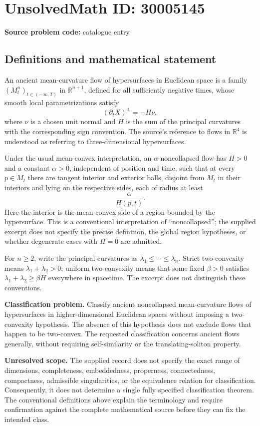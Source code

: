 \documentclass[11pt]{article}
\newcommand{\R}{\mathbb{R}}
\begin{document}
\section*{UnsolvedMath ID: 30005145}
\textbf{Source problem code:} catalogue entry
\subsection{Definitions and mathematical statement}
An ancient mean-curvature flow of hypersurfaces in Euclidean space is a family \((M_t^n)_{t\in(-\infty,T)}\) in \(\R^{n+1}\), defined for all sufficiently negative times, whose smooth local parametrizations satisfy
\[
(\partial_t X)^\perp=-H\nu,
\]
where \(\nu\) is a chosen unit normal and \(H\) is the sum of the principal curvatures with the corresponding sign convention. The source's reference to flows in \(\R^4\) is understood as referring to three-dimensional hypersurfaces.

Under the usual mean-convex interpretation, an \(\alpha\)-noncollapsed flow has \(H>0\) and a constant \(\alpha>0\), independent of position and time, such that at every \(p\in M_t\) there are tangent interior and exterior balls, disjoint from \(M_t\) in their interiors and lying on the respective sides, each of radius at least
\[
\frac{\alpha}{H(p,t)}.
\]
Here the interior is the mean-convex side of a region bounded by the hypersurface. This is a conventional interpretation of ``noncollapsed''; the supplied excerpt does not specify the precise definition, the global region hypotheses, or whether degenerate cases with \(H=0\) are admitted.

For \(n\geq2\), write the principal curvatures as \(\lambda_1\leq\cdots\leq\lambda_n\). Strict two-convexity means \(\lambda_1+\lambda_2>0\); uniform two-convexity means that some fixed \(\beta>0\) satisfies \(\lambda_1+\lambda_2\geq\beta H\) everywhere in spacetime. The excerpt does not distinguish these conventions.

\textbf{Classification problem.} Classify ancient noncollapsed mean-curvature flows of hypersurfaces in higher-dimensional Euclidean spaces without imposing a two-convexity hypothesis. The absence of this hypothesis does not exclude flows that happen to be two-convex. The requested classification concerns ancient flows generally, without requiring self-similarity or the translating-soliton property.

\textbf{Unresolved scope.} The supplied record does not specify the exact range of dimensions, completeness, embeddedness, properness, connectedness, compactness, admissible singularities, or the equivalence relation for classification. Consequently, it does not determine a single fully specified classification theorem. The conventional definitions above explain the terminology and require confirmation against the complete mathematical source before they can fix the intended class.
\end{document}
